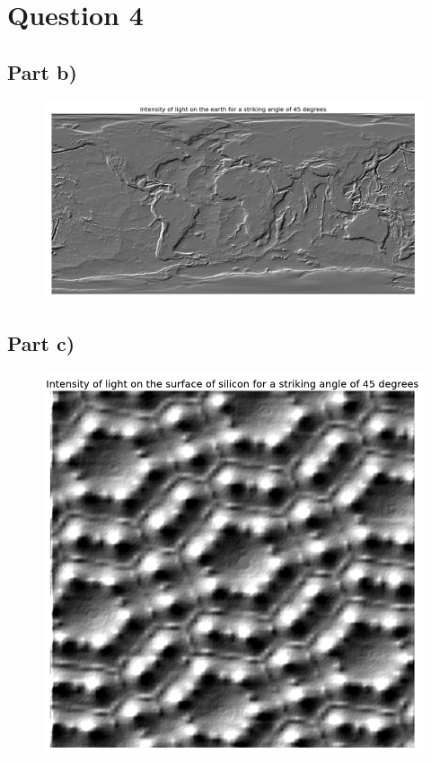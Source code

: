 \documentclass[a4paper,12pt]{article}
\begin{document}
\section{Question 4}
\subsection{Part b)}

\begin{figure}[H]
\centering
\includegraphics[width = \linewidth]{lab3q4b.png}
\caption{}
\label{fig:q4b}
\end{figure}

\subsection{Part c)}

\begin{figure}[H]
\centering
\includegraphics[width = \linewidth]{lab3q4c.png}
\caption{}
\label{fig:q4c}
\end{figure}
\end{document}
